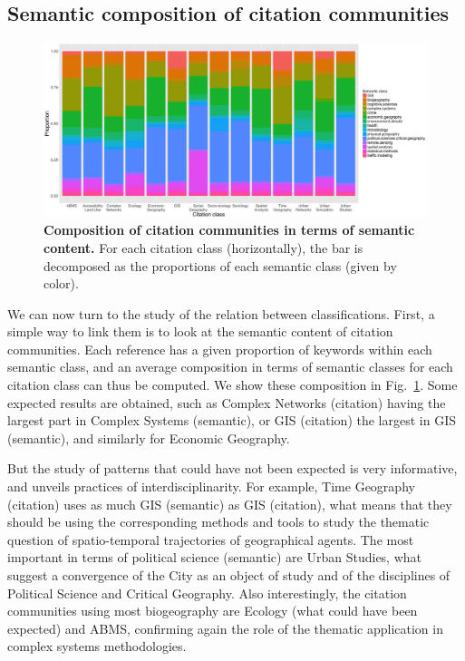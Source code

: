 \subsection*{Semantic composition of citation communities}


\begin{figure}
\centering
\includegraphics[width=\textwidth]{figures/Fig10.jpg}
\caption{\textbf{Composition of citation communities in terms of semantic content.} For each citation class (horizontally), the bar is decomposed as the proportions of each semantic class (given by color).}
\label{fig:citationcontent}
\end{figure}


We can now turn to the study of the relation between classifications. First, a simple way to link them is to look at the semantic content of citation communities. Each reference has a given proportion of keywords within each semantic class, and an average composition in terms of semantic classes for each citation class can thus be computed. We show these composition in Fig.~\ref{fig:citationcontent}. Some expected results are obtained, such as Complex Networks (citation) having the largest part in Complex Systems (semantic), or GIS (citation) the largest in GIS (semantic), and similarly for Economic Geography.

But the study of patterns that could have not been expected is very informative, and unveils practices of interdisciplinarity. For example, Time Geography (citation) uses as much GIS (semantic) as GIS (citation), what means that they should be using the corresponding methods and tools to study the thematic question of spatio-temporal trajectories of geographical agents. The most important in terms of political science (semantic) are Urban Studies, what suggest a convergence of the City as an object of study and of the disciplines of Political Science and Critical Geography. Also interestingly, the citation communities using most biogeography are Ecology (what could have been expected) and ABMS, confirming again the role of the thematic application in complex systems methodologies.





